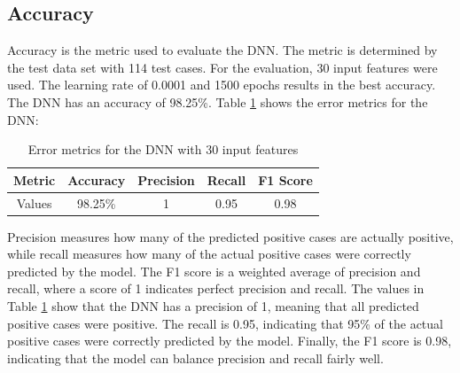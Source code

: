 \documentclass[11pt]{article}
\begin{document}
\subsection{Accuracy}
Accuracy is the metric used to evaluate the DNN. The metric is determined by the test data set with 114 test cases. For the evaluation, 30 input features were used. The learning rate of 0.0001 and 1500 epochs results in the best accuracy. The DNN has an accuracy of 98.25\%. Table \ref{MetricTable} shows the error metrics for the DNN:

\begin{table}[H]
\centering
\begin{tabular}{|c|c|c|c|c|}
\hline
 Metric & Accuracy & Precision & Recall & F1 Score \\ \hline
 Values & 98.25\% & 1 & 0.95 & 0.98 \\ \hline
\end{tabular}
\caption{Error metrics for the DNN with 30 input features} \label{MetricTable}
\end{table}

Precision measures how many of the predicted positive cases are actually positive, while recall measures how many of the actual positive cases were correctly predicted by the model. The F1 score is a weighted average of precision and recall, where a score of 1 indicates perfect precision and recall. The values in Table \ref{MetricTable} show that the DNN has a precision of 1, meaning that all predicted positive cases were positive. The recall is 0.95, indicating that 95\% of the actual positive cases were correctly predicted by the model. Finally, the F1 score is 0.98, indicating that the model can balance precision and recall fairly well.

\bigskip
\end{document}
